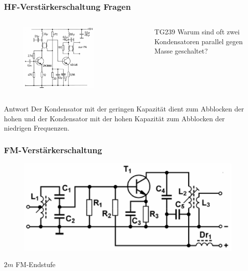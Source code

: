 \begin{frame}
  \frametitle{HF-Verstärkerschaltung Fragen}
  \begin{columns}
    \begin{figure}
      \includegraphics[width=0.7\textwidth,height=.5\textheight,keepaspectratio]{a07/TG237.png}
    \end{figure}
    \begin{center}
      \begin{exampleblock}{TG239}
        Warum sind oft zwei Kondensatoren parallel gegen Masse geschaltet?
      \end{exampleblock}
    \end{center}
  \end{columns}
  \pause
  \begin{exampleblock}{Antwort}
    Der Kondensator mit der geringen Kapazität dient zum Abblocken der hohen und der Kondensator mit der hohen Kapazität zum Abblocken der niedrigen Frequenzen.
  \end{exampleblock}
\end{frame}

\begin{frame}
  \frametitle{FM-Verstärkerschaltung}
  \begin{center}
    \begin{figure}
      \includegraphics[width=1\textwidth,height=.6\textheight,keepaspectratio]{a07/TG222.png}
    \end{figure}
  \end{center}
  $2m$ FM-Endstufe
\end{frame}

